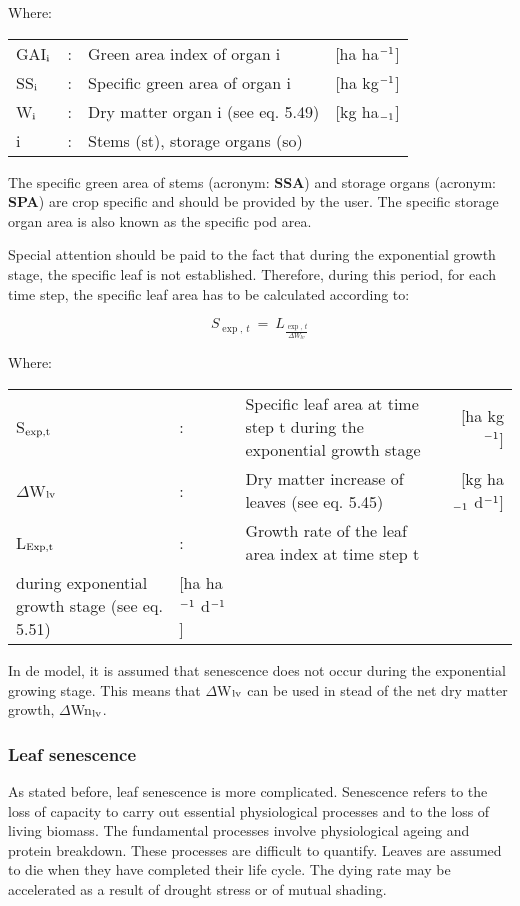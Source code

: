 Where:\\
\begin{tabularx}{\textwidth}{llXr}
GAI$_{{\rm i}}$ &:& Green area index of organ i    &
    [ha ha$^{{\rm -1}}$]\\
SS$_{{\rm i}}$ &:& Specific green area of organ i    &
    [ha kg$^{{\rm -1}}$]\\
W$_{{\rm i}}$ &:& Dry matter organ i (see eq. 5.49)    &
    [kg ha$_{{\rm -1}}$]\\
i &:& Stems (st), storage organs (so)\\
\end{tabularx}

The specific green area of stems (acronym: {\bf SSA}) and storage organs (acronym: {\bf SPA}) are
crop specific and should be provided by the user. The specific storage organ area is also
known as the specific pod area.

Special attention should be paid to the fact that during the exponential growth stage, the
specific leaf is not established. Therefore, during this period, for each time step, the
specific leaf area has to be calculated according to:

\begin{equation}
S _{\exp ,\, t} ~=~L _{\frac{\exp ,\, t}{\Delta W _{lv} }}
\end{equation}

Where:\\
\begin{tabularx}{\textwidth}{llXr}
S$_{{\rm exp,t}}$ &:& Specific leaf area at time step t during the 
    exponential growth stage    &     [ha kg$^{{\rm -1}}$]\\
$\Delta$W$_{{\rm lv}}$ &:& Dry matter increase of leaves (see eq. 5.45)   &
    [kg ha$_{{\rm -1}}$ d$^{{\rm -1}}$]\\
L$_{{\rm Exp,t}}$ &:& Growth rate of the leaf area index at time step t\\
   during exponential growth stage (see eq. 5.51)   &
        [ha ha$^{{\rm -1}}$ d$^{{\rm -1}}$]\\
\end{tabularx}

 
In de model, it is assumed that senescence does not occur during the exponential growing
stage. This means that $\Delta$W$_{{\rm lv}}$ can be used in stead of the net dry matter growth, $\Delta$Wn$_{{\rm lv}}$.

\subsubsection{Leaf senescence}
As stated before, leaf senescence is more complicated. Senescence refers to the loss of
capacity to carry out essential physio\-logical processes and to the loss of living biomass.
The fundamental processes involve physiological ageing and protein breakdown. These
processes are difficult to quantify. Leaves are assumed to die when they have completed
their life cycle. The dying rate may be accelerated as a result of drought stress or of
mutual shading.

